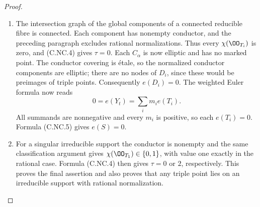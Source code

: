\begin{proof}
\begin{enumerate}[label={$\langle1\rangle$\arabic*.},leftmargin=*]
\item The intersection graph of the global components of a connected reducible fibre is connected. Each component has nonempty conductor, and the preceding paragraph excludes rational normalizations. Thus every $\chi(\OO_{T_i})$ is zero, and (C.NC.4) gives $\tau=0$. Each $C_\alpha$ is now elliptic and has no marked point. The conductor covering is étale, so the normalized conductor components are elliptic; there are no nodes of $D_i$, since these would be preimages of triple points. Consequently $e(D_i)=0$. The weighted Euler formula now reads
\[
 0=e(Y_t)=\sum_i m_i e(T_i).
\]
All summands are nonnegative and every $m_i$ is positive, so each $e(T_i)=0$. Formula (C.NC.5) gives $e(S)=0$.

\item For a singular irreducible support the conductor is nonempty and the same classification argument gives $\chi(\OO_{T_1})\in\{0,1\}$, with value one exactly in the rational case. Formula (C.NC.4) then gives $\tau=0$ or $2$, respectively. This proves the final assertion and also proves that any triple point lies on an irreducible support with rational normalization.

\end{enumerate}
\end{proof}